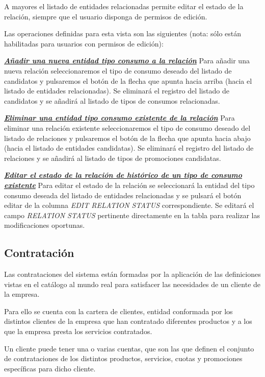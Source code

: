 A mayores el listado de entidades relacionadas permite editar el estado de la relación, siempre que el usuario disponga de permisos de edición.


Las operaciones definidas para esta vista son las siguientes (nota: sólo están habilitadas para usuarios con permisos de edición):

\underline{\textsl{\textbf{Añadir una nueva entidad tipo consumo a la relación}}} \newline
Para añadir una nueva relación seleccionaremos el tipo de consumo deseado del listado de candidatos y pulsaremos el botón de la flecha que apunta hacia arriba (hacia el listado de entidades relacionadas). Se eliminará el registro del listado de candidatos y se añadirá al listado de tipos de consumos relacionadas.


\underline{\textsl{\textbf{Eliminar una entidad tipo consumo existente de la relación}}}\newline
Para eliminar una relación existente seleccionaremos el tipo de consumo deseado del listado de relaciones y pulsaremos el botón de la flecha que apunta hacia abajo (hacia el listado de entidades candidatas). Se eliminará el registro del listado de relaciones y se añadirá al listado de tipos de promociones candidatas.


\underline{\textsl{\textbf{Editar el estado de la relación de histórico de un tipo de consumo existente}}}
Para editar el estado de la relación se seleccionará la entidad del tipo consumo  deseada del listado de entidades relacionadas y se pulsará el botón editar de la columna \textit{EDIT RELATION STATUS} correspondiente. Se editará el campo \emph{RELATION STATUS} pertinente directamente en la tabla para realizar las modificaciones oportunas.




\subsection{Contratación}
\label{sub:contratacion}

Las contrataciones del sistema están formadas por la aplicación de las definiciones vistas en el catálogo al mundo real para satisfacer las necesidades de un cliente de la empresa.

Para ello se cuenta con la cartera de clientes, entidad conformada por los distintos clientes de la empresa que han contratado diferentes productos y a los que la empresa presta los servicios contratados.

Un cliente puede tener una o varias cuentas, que son las que definen el conjunto de contrataciones de los distintos productos, servicios, cuotas y promociones específicas para dicho cliente.

